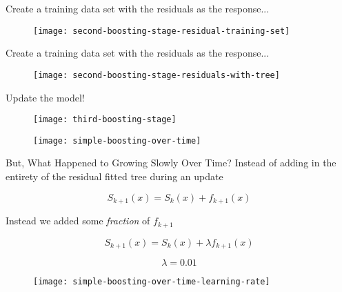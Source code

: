 \begin{frame}
Create a training data set with the residuals as the response...

  \begin{figure}
    \texttt{[image: second-boosting-stage-residual-training-set]}
  \end{figure}
  
\end{frame}
%

\begin{frame}
Create a training data set with the residuals as the response...

  \begin{figure}
    \texttt{[image: second-boosting-stage-residuals-with-tree]}
  \end{figure}
  
\end{frame}
%

\begin{frame}
Update the model!

  \begin{figure}
    \texttt{[image: third-boosting-stage]}
  \end{figure}
  
\end{frame}
%

\begin{frame}

  \begin{figure}
    \texttt{[image: simple-boosting-over-time]}
  \end{figure}
  
\end{frame}
%

\begin{frame}{But, What Happened to Growing Slowly Over Time?}
Instead of adding in the entirety of the residual fitted tree during an update

$$ S_{k+1}(x) = S_{k}(x) + f_{k+1}(x) $$

Instead we added some \textit{fraction} of $f_{k+1}$

$$ S_{k+1}(x) = S_{k}(x) + \lambda f_{k+1}(x) $$
\end{frame}
%

%

\begin{frame}
$$ \lambda = 0.01 $$

  \begin{figure}
    \texttt{[image: simple-boosting-over-time-learning-rate]}
  \end{figure}

\end{frame}
%

